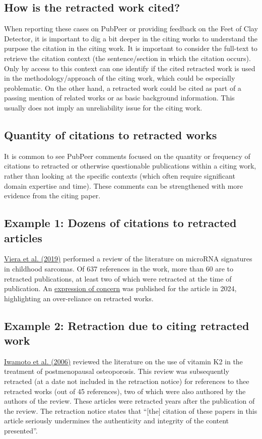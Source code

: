 \documentclass[letterpaper, 12pt]{article}
\begin{document}
\subsection*{How is the retracted work cited?}

When reporting these cases on PubPeer or providing feedback on the Feet of Clay Detector, it is important to dig a bit deeper in the citing works to understand the purpose the citation in the citing work. It is important to consider the full-text to retrieve the citation context (the sentence/section in which the citation occurs). Only by access to this context can one identify if the cited retracted work is used in the methodology/approach of the citing work, which could be especially problematic. On the other hand, a retracted work could be cited as part of a passing mention of related works or as basic background information. This usually does not imply an unreliability issue for the citing work. 

\subsection*{Quantity of citations to retracted works}

It is common to see PubPeer comments focused on the quantity or frequency of citations to retracted or otherwise questionable publications within a citing work, rather than looking at the specific contexts (which often require significant domain expertise and time). These comments can be strengthened with more evidence from the citing paper. 

\subsection*{Example 1: Dozens of citations to retracted articles}
\href{https://doi.org/10.1007/s12094-019-02104-z}{Viera et al. (2019)} performed a review of the literature on microRNA signatures in childhood sarcomas. Of 637 references in the work, more than 60 are to retracted publications, at least two of which were retracted at the time of publication. An \href{https://doi.org/10.1007/s12094-024-03518-0}{expression of concern} was published for the article in 2024, highlighting an over-reliance on retracted works.
\subsection*{Example 2: Retraction due to citing retracted work}
\href{http://dx.doi.org/10.2174/157488606775252629}{Iwamoto et al. (2006)} reviewed the literature on the use of vitamin K2 in the treatment of postmenopausal osteoporosis. This review was subsequently retracted (at a date not included in the retraction notice) for references to thee retracted works (out of 45 references), two of which were also authored by the authors of the review. These articles were retracted years after the publication of the review. The retraction notice states that ``[the] citation of these papers in this article seriously undermines the authenticity and integrity of the content presented''.
\end{document}
